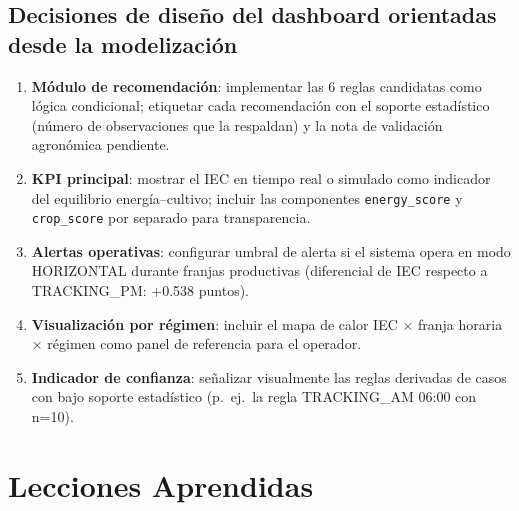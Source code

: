 \documentclass[12pt,a4paper]{article}
\begin{document}
\subsection{Decisiones de diseño del dashboard orientadas desde la modelización}

\begin{enumerate}
  \item \textbf{Módulo de recomendación}: implementar las 6 reglas candidatas como lógica condicional; etiquetar cada recomendación con el soporte estadístico (número de observaciones que la respaldan) y la nota de validación agronómica pendiente.
  \item \textbf{KPI principal}: mostrar el IEC en tiempo real o simulado como indicador del equilibrio energía--cultivo; incluir las componentes \texttt{energy\_score} y \texttt{crop\_score} por separado para transparencia.
  \item \textbf{Alertas operativas}: configurar umbral de alerta si el sistema opera en modo HORIZONTAL durante franjas productivas (diferencial de IEC respecto a TRACKING\_PM: +0.538 puntos).
  \item \textbf{Visualización por régimen}: incluir el mapa de calor IEC × franja horaria × régimen como panel de referencia para el operador.
  \item \textbf{Indicador de confianza}: señalizar visualmente las reglas derivadas de casos con bajo soporte estadístico (p.~ej.\ la regla TRACKING\_AM 06:00 con n=10).
\end{enumerate}

\newpage
\section{Lecciones Aprendidas}
\end{document}
